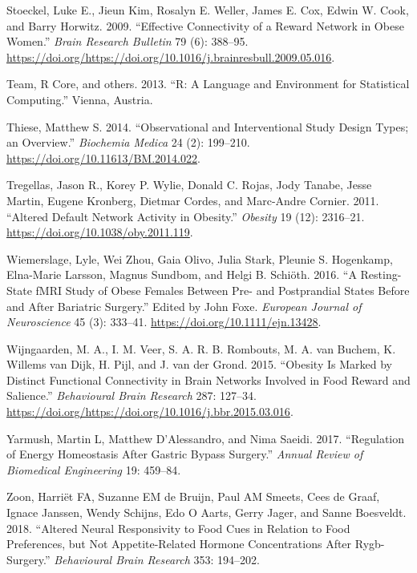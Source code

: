 \documentclass[
]{article}
\begin{document}
\leavevmode\hypertarget{ref-Stoeckel_2009}{}%
Stoeckel, Luke E., Jieun Kim, Rosalyn E. Weller, James E. Cox, Edwin W. Cook, and Barry Horwitz. 2009. ``Effective Connectivity of a Reward Network in Obese Women.'' \emph{Brain Research Bulletin} 79 (6): 388--95. \url{https://doi.org/https://doi.org/10.1016/j.brainresbull.2009.05.016}.

\leavevmode\hypertarget{ref-team2013r}{}%
Team, R Core, and others. 2013. ``R: A Language and Environment for Statistical Computing.'' Vienna, Austria.

\leavevmode\hypertarget{ref-Thiese_2014}{}%
Thiese, Matthew S. 2014. ``Observational and Interventional Study Design Types; an Overview.'' \emph{Biochemia Medica} 24 (2): 199--210. \url{https://doi.org/10.11613/BM.2014.022}.

\leavevmode\hypertarget{ref-Tregellas_2011}{}%
Tregellas, Jason R., Korey P. Wylie, Donald C. Rojas, Jody Tanabe, Jesse Martin, Eugene Kronberg, Dietmar Cordes, and Marc-Andre Cornier. 2011. ``Altered Default Network Activity in Obesity.'' \emph{Obesity} 19 (12): 2316--21. \url{https://doi.org/10.1038/oby.2011.119}.

\leavevmode\hypertarget{ref-Wiemerslage_2016}{}%
Wiemerslage, Lyle, Wei Zhou, Gaia Olivo, Julia Stark, Pleunie S. Hogenkamp, Elna-Marie Larsson, Magnus Sundbom, and Helgi B. Schiöth. 2016. ``A Resting-State fMRI Study of Obese Females Between Pre- and Postprandial States Before and After Bariatric Surgery.'' Edited by John Foxe. \emph{European Journal of Neuroscience} 45 (3): 333--41. \url{https://doi.org/10.1111/ejn.13428}.

\leavevmode\hypertarget{ref-Wijngaarden_2015}{}%
Wijngaarden, M. A., I. M. Veer, S. A. R. B. Rombouts, M. A. van Buchem, K. Willems van Dijk, H. Pijl, and J. van der Grond. 2015. ``Obesity Is Marked by Distinct Functional Connectivity in Brain Networks Involved in Food Reward and Salience.'' \emph{Behavioural Brain Research} 287: 127--34. \url{https://doi.org/https://doi.org/10.1016/j.bbr.2015.03.016}.

\leavevmode\hypertarget{ref-Yarmush_2017}{}%
Yarmush, Martin L, Matthew D'Alessandro, and Nima Saeidi. 2017. ``Regulation of Energy Homeostasis After Gastric Bypass Surgery.'' \emph{Annual Review of Biomedical Engineering} 19: 459--84.

\leavevmode\hypertarget{ref-Zoon_2018}{}%
Zoon, Harriët FA, Suzanne EM de Bruijn, Paul AM Smeets, Cees de Graaf, Ignace Janssen, Wendy Schijns, Edo O Aarts, Gerry Jager, and Sanne Boesveldt. 2018. ``Altered Neural Responsivity to Food Cues in Relation to Food Preferences, but Not Appetite-Related Hormone Concentrations After Rygb-Surgery.'' \emph{Behavioural Brain Research} 353: 194--202.
\end{document}
